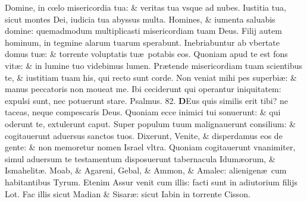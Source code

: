 \documentclass[a5paper,10pt]{book}
\def\ae{æ}
\def\oe{œ}
\begin{document}
\begin{multicols*}{2}
\newline \color{red} D\color{black}omine, in c\oe lo misericordia tua: \& veritas tua vsque ad nubes.
\newline \color{red} I\color{black}ustitia tua, sicut montes Dei, iudicia tua abyssus multa.
\newline \color{red} H\color{black}omines, \& iumenta saluabis domine: quemadmodum multiplicasti misericordiam tuam Deus.
\newline \color{red} F\color{black}ilij autem hominum, in tegmine alarum tuarum sperabunt.
\newline \color{red} I\color{black}nebriabuntur ab vbertate domus tu\ae : \& torrente voluptatis tu\ae \ potabis eos.
\newline \color{red} Q\color{black}uoniam apud te est fons vit\ae : \& in lumine tuo videbimus lumen.
\newline \color{red} P\color{black}r\ae tende misericordiam tuam scientibus te, \& iustitiam tuam his, qui recto sunt corde.
\newline \color{red} N\color{black}on veniat mihi pes superbi\ae : \& manus peccatoris non moueat me.
\newline \color{red} I\color{black}bi ceciderunt qui operantur iniquitatem: expulsi sunt, nec potuerunt stare. \quad \color{red} Psalmus. 82. \color{black}
\vspace{-1em}
\lettrine[lines=2]{\bfseries \color{red} D}{}Eus quis similis erit tibi? ne taceas, neque compescaris Deus.
\newline \color{red} Q\color{black}uoniam ecce inimici tui sonuerunt: \& qui oderunt te, extulerunt caput.
\newline \color{red} S\color{black}uper populum tuum malignauerunt consilium: \& cogitauerunt aduersus sanctos tuos.
\newline \color{red} D\color{black}ixerunt, Venite, \& disperdamus eos de gente: \& non memoretur nomen Israel vltra.
\newline \color{red} Q\color{black}uoniam cogitauerunt vnanimiter, simul aduersum te testamentum disposuerunt tabernacula Idum\ae orum, \& Ismahelit\ae .
\newline \color{red} M\color{black}oab, \& Agareni, Gebal, \& Ammon, \& Amalec: alienigen\ae \ cum habitantibus Tyrum.
\newline \color{red} E\color{black}tenim Assur venit cum illis: facti sunt in adiutorium filijs Lot.
\newline \color{red} F\color{black}ac illis sicut Madian \& Sisar\ae : sicut Iabin in torrente Cisson.

\end{multicols*}
\end{document}
